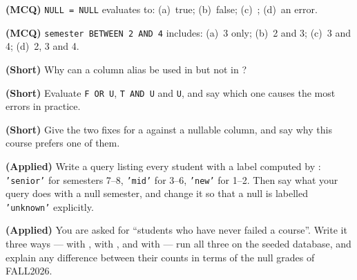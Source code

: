 \begin{reviewq}
  \item \textbf{(MCQ)} \texttt{NULL = NULL} evaluates to: (a)~true;
        (b)~false; (c)~\unk{}; (d)~an error.
  \item \textbf{(MCQ)} \texttt{semester BETWEEN 2 AND 4} includes:
        (a)~3 only; (b)~2 and 3; (c)~3 and 4; (d)~2, 3 and 4.
  \item \textbf{(Short)} Why can a column alias be used in 
        but not in ?
  \item \textbf{(Short)} Evaluate \texttt{F OR U}, \texttt{T AND U} and
         \texttt{U}, and say which one causes the most errors in
        practice.
  \item \textbf{(Short)} Give the two fixes for a  against a
        nullable column, and say why this course prefers one of them.
  \item \textbf{(Applied)} Write a query listing every student with a label
        computed by : \texttt{'senior'} for semesters 7--8,
        \texttt{'mid'} for 3--6, \texttt{'new'} for 1--2. Then say what your
        query does with a null semester, and change it so that a null is
        labelled \texttt{'unknown'} explicitly.
  \item \textbf{(Applied)} You are asked for ``students who have never failed
        a course''. Write it three ways --- with , with
        , and with  --- run all three on the
        seeded database, and explain any difference between their counts in
        terms of the null grades of FALL2026.
\end{reviewq}
